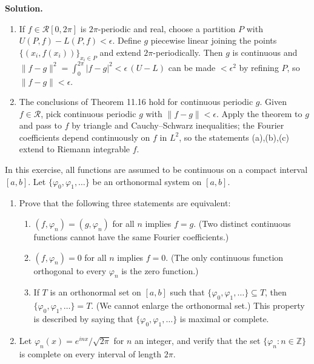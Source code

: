 \noindent\textbf{Solution.}
\begin{enumerate}[label=(\alph*)]
\item If $f\in\mathcal R[0,2\pi]$ is $2\pi$-periodic and real, choose a partition $P$ with $U(P,f)-L(P,f)<\epsilon$. Define $g$ piecewise linear joining the points $\{(x_i,f(x_i))\}_{x_i\in P}$ and extend $2\pi$-periodically. Then $g$ is continuous and $\|f-g\|^2=\int_0^{2\pi}|f-g|^2<\epsilon\,(U-L)$ can be made $<\epsilon^2$ by refining $P$, so $\|f-g\|<\epsilon$.
\item The conclusions of Theorem 11.16 hold for continuous periodic $g$. Given $f\in\mathcal R$, pick continuous periodic $g$ with $\|f-g\|<\epsilon$. Apply the theorem to $g$ and pass to $f$ by triangle and Cauchy–Schwarz inequalities; the Fourier coefficients depend continuously on $f$ in $L^2$, so the statements (a),(b),(c) extend to Riemann integrable $f$.
\end{enumerate}

\begin{problembox}
In this exercise, all functions are assumed to be continuous on a compact interval $[a, b]$. Let $\{\varphi_0, \varphi_1, \dots\}$ be an orthonormal system on $[a, b]$.
\begin{enumerate}[label=(\alph*)]
\item Prove that the following three statements are equivalent:
\begin{enumerate}[label=\arabic*)]
\item $(f, \varphi_n) = (g, \varphi_n)$ for all $n$ implies $f = g$. (Two distinct continuous functions cannot have the same Fourier coefficients.)
\item $(f, \varphi_n) = 0$ for all $n$ implies $f = 0$. (The only continuous function orthogonal to every $\varphi_n$ is the zero function.)
\item If $T$ is an orthonormal set on $[a, b]$ such that $\{\varphi_0, \varphi_1, \dots\} \subseteq T$, then $\{\varphi_0, \varphi_1, \dots\} = T$. (We cannot enlarge the orthonormal set.) This property is described by saying that $\{\varphi_0, \varphi_1, \dots\}$ is maximal or complete.
\end{enumerate}
\item Let $\varphi_n(x) = e^{inx}/\sqrt{2\pi}$ for $n$ an integer, and verify that the set $\{\varphi_n : n \in \mathbb{Z}\}$ is complete on every interval of length $2\pi$.
\end{enumerate}
\end{problembox}

